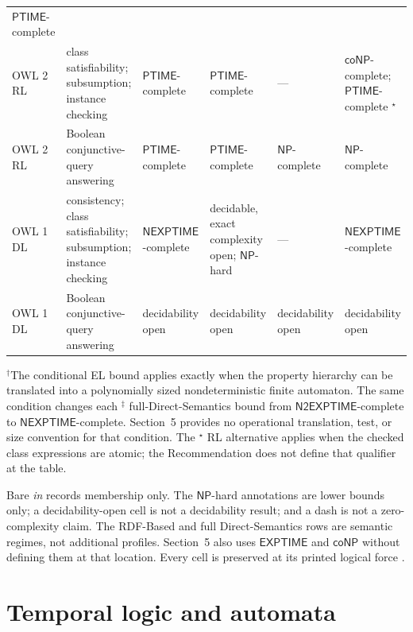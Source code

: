 \begin{longtable}{@{}p{}p{}p{}p{}p{}p{}@{}}
\(\mathsf{PTIME}\)-complete \\
OWL 2 RL &
class satisfiability; subsumption; instance checking &
\(\mathsf{PTIME}\)-complete & \(\mathsf{PTIME}\)-complete & --- &
\(\mathsf{coNP}\)-complete; \(\mathsf{PTIME}\)-complete
\({}^{\star}\) \\
OWL 2 RL & Boolean conjunctive-query answering &
\(\mathsf{PTIME}\)-complete & \(\mathsf{PTIME}\)-complete &
\(\mathsf{NP}\)-complete & \(\mathsf{NP}\)-complete \\
\addlinespace
OWL 1 DL &
consistency; class satisfiability; subsumption; instance checking &
\(\mathsf{NEXPTIME}\)-complete &
decidable, exact complexity open; \(\mathsf{NP}\)-hard &
--- & \(\mathsf{NEXPTIME}\)-complete \\
OWL 1 DL & Boolean conjunctive-query answering &
decidability open & decidability open & decidability open & decidability open \\
\bottomrule
\end{longtable}

\noindent\({}^{\dagger}\)The conditional EL bound applies exactly when the
property hierarchy can be translated into a polynomially sized nondeterministic
finite automaton.  The same condition changes each
\({}^{\ddagger}\) full-Direct-Semantics bound from
\(\mathsf{N2EXPTIME}\)-complete to \(\mathsf{NEXPTIME}\)-complete.  Section~5
provides no operational translation, test, or size convention for that
condition.  The \({}^{\star}\) RL alternative applies when the checked class
expressions are atomic; the Recommendation does not define that qualifier at
the table.

Bare \emph{in} records membership only.  The \(\mathsf{NP}\)-hard annotations
are lower bounds only; a decidability-open cell is not a decidability result;
and a dash is not a zero-complexity claim.  The RDF-Based and full
Direct-Semantics rows are semantic regimes, not additional profiles.  Section~5
also uses \(\mathsf{EXPTIME}\) and \(\mathsf{coNP}\) without defining them at
that location.  Every cell is preserved at its printed logical force
\cite[\S5 and table~10]{W3COWL2Profiles2012}.
\endgroup




\section{Temporal logic and automata}
\label{sec:p09-temporal-automata}


